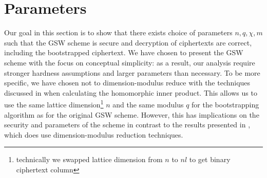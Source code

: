 \section{Parameters}\label{sec:parameters}
Our goal in this section is to show that there exists choice of parameters $n, q, \chi, m$ such that the GSW scheme is secure and decryption of ciphertexts are correct, including the bootstrapped ciphertext. We have chosen to present the GSW scheme with the focus on conceptual simplicity: as a result, our analysis require stronger hardness assumptions and larger parameters than necessary. To be more specific, we have chosen not to dimension-modulus reduce with the techniques discussed in \cite{BV11} when calculating the homomorphic inner product. This allows us to use the same lattice dimension\footnote{technically we swapped lattice dimension from $n$ to $nl$ to get binary ciphertext column} $n$ and the same modulus $q$ for the bootstrapping algorithm as for the original GSW scheme. However, this has implications on the security and parameters of the scheme in contrast to the results presented in \cite{A-S-P-boot}, which does use dimension-modulus reduction techniques.
